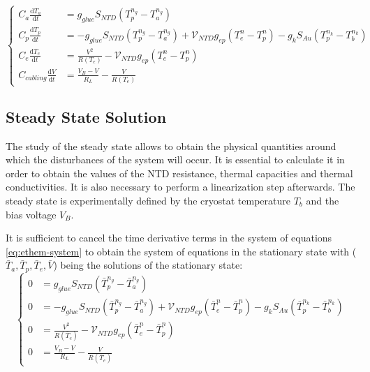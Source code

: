 \begin{equation}
\begin{cases}
\label{eq:ethem-system}
\displaystyle C_a \frac{\mathrm{d} T_a}{\mathrm{d} t} &= g_{glue} S_{NTD} \left( T_p^{n_g} - T_a^{n_g} \right) \\[10pt]
\displaystyle C_p \frac{\mathrm{d} T_p}{\mathrm{d} t}
&=
-g_{glue} S_{NTD} \left( T_p^{n_g} - T_a^{n_g} \right) 
+ \mathcal{V}_{NTD} g_{ep} \left( T_e^{n} - T_p^{n} \right)
- g_k S_{Au} \left( T_p^{n_k} - T_b^{n_k} \right) \\[10pt]
\displaystyle C_e \frac{\mathrm{d} T_e}{\mathrm{d} t} &= \frac{V^2}{R(T_e)} - \mathcal{V}_{NTD} g_{ep} \left( T_e^{n} - T_p^{n} \right) \\[10pt]
\displaystyle C_{cabling} \frac{\mathrm{d} V}{\mathrm{d} t} &= \frac{V_B - V}{R_L} - \frac{V}{R(T_e)}
 \end{cases}
\end{equation}


\subsection{Steady State Solution}
\label{par:stationnary-state}
\label{par:steady-state}

The study of the steady state allows to obtain the physical quantities around which the disturbances of the system will occur. It is essential to calculate it in order to obtain the values of the NTD resistance, thermal capacities and thermal conductivities. It is also necessary to perform a linearization step afterwards. The steady state is experimentally defined by the cryostat temperature $T_b$ and the bias voltage $V_B$. 

It is sufficient to cancel the time derivative terms in the system of equations \ref{eq:ethem-system} to obtain the system of equations in the stationary state with ($\bar{T}_a, \bar{T}_p, \bar{T}_e, \bar{V}$) being the solutions of the stationary state:
\begin{equation}
\begin{cases}
\label{eq:ethem-system-stationnary}
0 &= g_{glue} S_{NTD} \left( \bar{T}_p^{n_g} - \bar{T}_a^{n_g} \right)  \\[8pt]
0 &= -g_{glue} S_{NTD} \left( \bar{T}_p^{n_g} - \bar{T}_a^{n_g} \right) + \mathcal{V}_{NTD}  g_{ep} \left( \bar{T}_e^{n} - \bar{T}_p^{n} \right) - g_k S_{Au} \left( \bar{T}_p^{n_k} - \bar{T}_b^{n_k} \right)  \\[8pt]
0 &= \frac{V^2}{R(\bar{T}_e)} - \mathcal{V}_{NTD} g_{ep} \left( \bar{T}_e^{n} - \bar{T}_p^{n} \right)  \\[8pt]
0 &= \frac{V_B - V}{R_L} - \frac{V}{R(\bar{T}_e)}
 \end{cases}
\end{equation}

